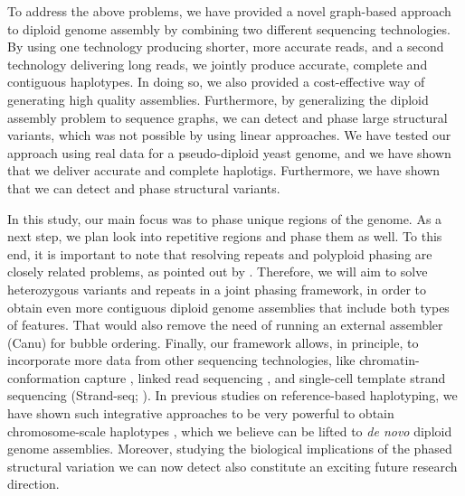 To address the above problems, we have provided a novel graph-based approach to diploid genome assembly by combining two different sequencing technologies.
By using one technology producing shorter, more accurate reads, and a second technology delivering long reads, we jointly produce accurate, complete and contiguous haplotypes. 
In doing so, we also provided a cost-effective way of generating high quality assemblies.
Furthermore, by generalizing the diploid assembly problem to sequence graphs, we can detect and phase large structural variants, which was not possible by using linear approaches. 
We have tested our approach using real data for a pseudo-diploid yeast genome, and we have shown that we deliver accurate and complete haplotigs.
Furthermore, we have shown that we can detect and phase structural variants.

In this study, our main focus was to phase unique regions of the genome.
As a next step, we plan look into repetitive regions and phase them as well.
To this end, it is important to note that resolving repeats and polyploid phasing are closely related problems, as pointed out by \cite{Chaisson2017}.
Therefore, we will aim to solve heterozygous variants and repeats in a joint phasing framework, in order to obtain even more contiguous diploid genome assemblies that include both types of features.
That would also remove the need of running an external assembler (Canu) for bubble ordering.
Finally, our framework allows, in principle, to incorporate more data from other sequencing technologies, like chromatin-conformation capture \citep{burton2013chromosome}, linked read sequencing \citep{weisenfeld2017direct}, and single-cell template strand sequencing (Strand-seq; \citealp{Porubsky2016}).
In previous studies on reference-based haplotyping, we have shown such integrative approaches to be very powerful to obtain chromosome-scale haplotypes \citep{porubsky2017dense,chaisson2017multi}, which we believe can be lifted to \textit{de novo} diploid genome assemblies.
Moreover, studying the biological implications of the phased structural variation we can now detect also constitute an exciting future research direction.

